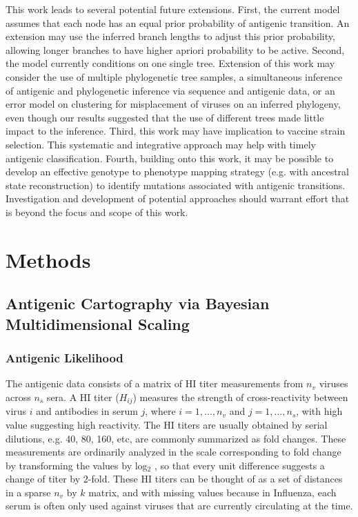 \documentclass[11pt,oneside,letterpaper]{article}
\begin{document}
This work leads to several potential future extensions. 
First, the current model assumes that each node has an equal prior probability of antigenic transition. 
An extension may use the inferred branch lengths to adjust this prior probability, allowing longer branches to have higher apriori probability to be active.
Second, the model currently conditions on one single tree. 
Extension of this work may consider the use of multiple phylogenetic tree samples, a simultaneous inference of antigenic and phylogenetic inference via sequence and antigenic data, or  an error model on clustering for misplacement of viruses on an inferred phylogeny, even though our results suggested that the use of different trees made little impact to the inference. 
Third, this work may have implication to vaccine strain selection. 
This systematic and integrative approach may help with timely antigenic classification. 
Fourth, building onto this work, it may be possible to develop an effective genotype to phenotype mapping strategy (e.g. with ancestral state reconstruction) to identify mutations associated with antigenic transitions. 
Investigation and development of potential approaches should warrant effort that is beyond the focus and scope of this work.






\newpage




\section*{Methods}


\subsection*{Antigenic Cartography via Bayesian Multidimensional Scaling}



\subsubsection*{Antigenic Likelihood }


The antigenic data consists of a matrix of HI titer measurements from $n_v$ viruses across $n_s$ sera.  
A HI titer ($H_{ij}$) measures the strength of cross-reactivity between virus $i$ and antibodies in serum $j$, where $i=1, ...,  n_v$ and $j=1,...,n_s$, with high value suggesting high reactivity. 
The HI titers are usually obtained by serial dilutions, e.g. 40, 80, 160, etc, are commonly summarized as fold changes. These measurements are ordinarily analyzed in the scale corresponding to fold change by transforming the values by log$_2$ \cite{smith_mapping_2004, bedford_integrating_2014}, so that every unit difference suggests a change of titer by 2-fold. 
These HI titers can be thought of as a set of distances in a sparse $n_v$ by $k$ matrix, and with missing values because in Influenza, each serum is often only used against viruses that are currently circulating at the time.
	
\end{document}
